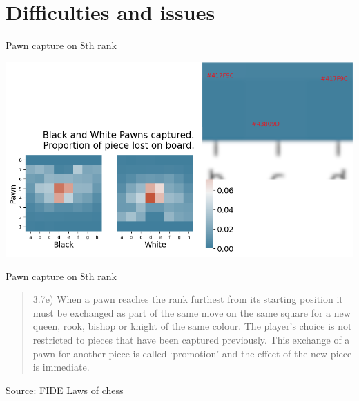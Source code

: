 \documentclass[presentation, 8pt]{beamer}
\begin{document}
\section{Difficulties and issues}
\label{sec:org6796e7c}
\begin{frame}[label={sec:org8f90311}]{Pawn capture on 8th rank}
\begin{center}
\includegraphics[width=.9\linewidth]{Images/Pawn on 8th rank.png}
\end{center}
\end{frame}
\begin{frame}[label={sec:orgbdbcd23}]{Pawn capture on 8th rank}
\begin{quote}
3.7e) When  a  pawn  reaches  the  rank  furthest  from  its  starting  position  it  must  be  exchanged  as  part  of  the  same  move  on  the  same  square  for  a  new queen,  rook,  bishop  or  knight  of  the  same  colour.  The  player’s  choice  is  not  restricted  to  pieces  that  have  been  captured  previously.  This  exchange  of  a  pawn  for  another  piece  is  called ‘promotion’ and the effect of the new piece is immediate.
\end{quote}
\href{https://www.fide.com/FIDE/handbook/LawsOfChess.pdf}{Source: FIDE Laws of chess}
\end{frame}
\end{document}
